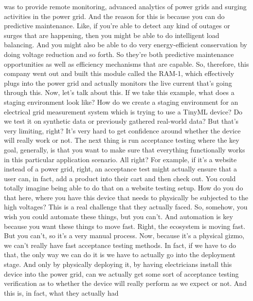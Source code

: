 {{{{    was to provide remote monitoring, advanced analytics of power grids
    and surging activities in the power grid.
    And the reason for this is because you can do predictive maintenance.
    Like, if you're able to detect any kind of outages or surges
    that are happening, then you might be able to do intelligent load balancing.
    And you might also be able to do very energy-efficient conservation by doing
    voltage reduction and so forth.
    So they're both predictive maintenance opportunities as well as
    efficiency mechanisms that are capable.
    So, therefore, this company went out and built
    this module called the RAM-1, which effectively plugs into the power grid
    and actually monitors the live current that's going through this.
    Now, let's talk about this.
    If we take this example, what does a staging environment look like?
    How do we create a staging environment for an electrical grid measurement
    system which is trying to use a TinyML device?
    Do we test it on synthetic data or previously gathered real-world data?
    But that's very limiting, right?
    It's very hard to get confidence around whether the device will really work
    or not.
    The next thing is run acceptance testing where the key goal, generally,
    is that you want to make sure that everything functionally works
    in this particular application scenario.
    All right?
    For example, if it's a website instead of a power grid,
    right, an acceptance test might actually ensure
    that a user can, in fact, add a product into their cart and then check out.
    You could totally imagine being able to do that on a website testing setup.
    How do you do that here, where you have this device that needs to physically
    be subjected to the high voltages?
    This is a real challenge that they actually faced.
    So, somehow, you wish you could automate these things, but you can't.
    And automation is key because you want these things to move fast.
    Right, the ecosystem is moving fast.
    But you can't, so it's a very manual process.
    Now, because it's a physical gizmo, we can't really
    have fast acceptance testing methods.
    In fact, if we have to do that, the only way we can do it is we
    have to actually go into the deployment stage.
    And only by physically deploying it, by having electricians install
    this device into the power grid, can we actually get
    some sort of acceptance testing verification
    as to whether the device will really perform as we expect or not.
    And this is, in fact, what they actually had
}}}}

